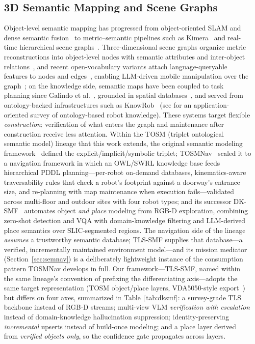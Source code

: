 \documentclass[electronics,article,accept,pdftex,moreauthors]{Definitions/mdpi}
\begin{document}
\subsection{3D Semantic Mapping and Scene Graphs}
Object-level semantic mapping has progressed from object-oriented SLAM and
dense semantic fusion~\cite{salas2013slampp,mccormac2017semanticfusion} to
metric--semantic pipelines such as Kimera~\cite{rosinol2020kimera} and
real-time hierarchical scene graphs~\cite{hughes2022hydra}. Three-dimensional scene
graphs organize metric reconstructions into object-level nodes with
semantic attributes and inter-object relations~\cite{armeni20193dsg}, and
recent open-vocabulary variants attach language-queryable features to nodes
and edges~\cite{koch2024open3dsg,gu2024conceptgraphs}, enabling LLM-driven
mobile manipulation over the graph~\cite{honerkamp2024momallm}; on the
knowledge side, semantic maps have been coupled to task planning since
Galindo et al.~\cite{galindo2008task}, grounded in spatial
databases~\cite{deeken2018semap}, and served from ontology-backed
infrastructures such as KnowRob~\cite{tenorth2013knowrob} (see
\cite{manzoor2021survey} for an application-oriented survey of
ontology-based robot knowledge). These systems
target flexible \emph{construction}; verification of what enters the graph
and maintenance after construction receive less attention. Within the TOSM
(triplet ontological semantic model) lineage that this work extends, the
original semantic modeling framework~\cite{joo2020tosm} defined the
explicit/implicit/symbolic triplet; TOSMNav~\cite{joo2022fsom} scaled it
to a navigation framework in which an OWL/SWRL knowledge base feeds
hierarchical PDDL planning---per-robot on-demand databases,
kinematics-aware traversability rules that check a robot's footprint
against a doorway's entrance size, and re-planning with map maintenance
when execution fails---validated across multi-floor and outdoor sites
with four robot types; and its successor DK-SMF~\cite{joo2025dksmf}
automates object \emph{and place} modeling from RGB-D exploration, combining
zero-shot detection and VQA with domain-knowledge filtering and LLM-derived
place semantics over SLIC-segmented regions. The navigation side of the
lineage \emph{assumes} a trustworthy semantic database; TLS-SMF supplies
that database---a verified, incrementally maintained environment
model---and
its mission mediator (Section~\ref{sec:semnav}) is a deliberately lightweight
instance of the consumption pattern TOSMNav develops in full. Our framework---TLS-SMF, named
within the same lineage's convention of prefixing the differentiating
axis---adopts the same target representation (TOSM object/place layers,
VDA5050-style export~\cite{vda5050}) but differs on four axes, summarized in
Table~\ref{tab:dksmf}: a survey-grade
TLS backbone instead of RGB-D streams; multi-view VLM \emph{verification
with escalation} instead of domain-knowledge hallucination suppression;
identity-preserving \emph{incremental} upserts instead of build-once
modeling; and a place layer derived from \emph{verified objects only}, so
the confidence gate propagates across layers.
\end{document}
